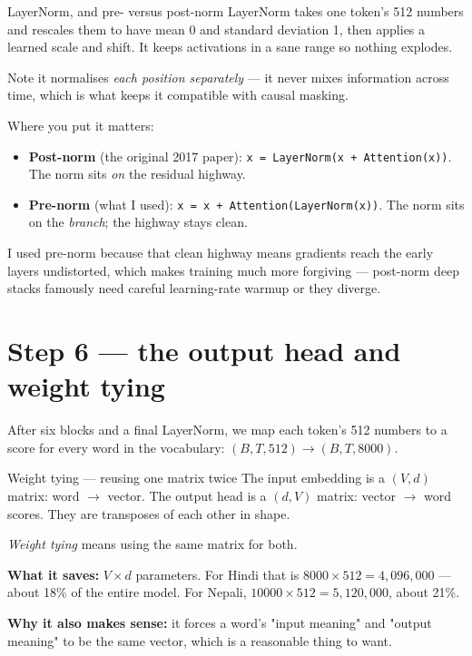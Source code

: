 \documentclass[11pt]{report}
\newcommand{\p}[1]{\texttt{#1}}
\begin{document}
\begin{concept}{LayerNorm, and pre- versus post-norm}
LayerNorm takes one token's 512 numbers and rescales them to have mean 0 and
standard deviation 1, then applies a learned scale and shift. It keeps activations
in a sane range so nothing explodes.

Note it normalises \emph{each position separately} --- it never mixes information
across time, which is what keeps it compatible with causal masking.

Where you put it matters:
\begin{itemize}[leftmargin=*]
\item \textbf{Post-norm} (the original 2017 paper):
      \p{x = LayerNorm(x + Attention(x))}. The norm sits \emph{on} the residual
      highway.
\item \textbf{Pre-norm} (what I used):
      \p{x = x + Attention(LayerNorm(x))}. The norm sits on the \emph{branch};
      the highway stays clean.
\end{itemize}

I used pre-norm because that clean highway means gradients reach the early layers
undistorted, which makes training much more forgiving --- post-norm deep stacks
famously need careful learning-rate warmup or they diverge.
\end{concept}

\section{Step 6 --- the output head and weight tying}

After six blocks and a final LayerNorm, we map each token's 512 numbers to a
score for every word in the vocabulary: $(B,T,512) \to (B,T,8000)$.

\begin{concept}{Weight tying --- reusing one matrix twice}
The input embedding is a $(V, d)$ matrix: word $\to$ vector. The output head is a
$(d, V)$ matrix: vector $\to$ word scores. They are transposes of each other in
shape.

\emph{Weight tying} means using the same matrix for both.

\textbf{What it saves:} $V \times d$ parameters. For Hindi that is
$8000 \times 512 = 4{,}096{,}000$ --- about 18\% of the entire model. For Nepali,
$10000 \times 512 = 5{,}120{,}000$, about 21\%.

\textbf{Why it also makes sense:} it forces a word's "input meaning" and "output
meaning" to be the same vector, which is a reasonable thing to want.
\end{concept}
\end{document}
